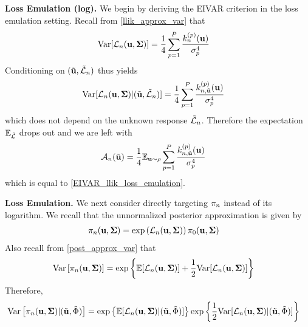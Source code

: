 \documentclass[12pt]{article}
\begin{document}
\bigskip
\noindent
\textbf{Loss Emulation (log).} 
We begin by deriving the EIVAR criterion in the loss emulation setting. Recall from \ref{llik_approx_var} that 
\begin{align*}
\mathrm{Var}[\mathcal{L}_{n}(\mathbf{u}, \boldsymbol{\Sigma})] &= \frac{1}{4} \sum_{p = 1}^{P} \frac{k_{n}^{(p)}(\mathbf{u})}{\sigma_{p}^4}
\end{align*}
Conditioning on $(\tilde{\mathbf{u}}, \tilde{\mathcal{L}}_{n})$ thus yields 
\begin{align*}
\mathrm{Var}[\mathcal{L}_{n}(\mathbf{u}, \boldsymbol{\Sigma}) | (\tilde{\mathbf{u}}, \tilde{\mathcal{L}}_{n})] &= \frac{1}{4} \sum_{p = 1}^{P} \frac{k_{n, \tilde{\mathbf{u}}}^{(p)}(\mathbf{u})}{\sigma_{p}^4}
\end{align*}
which does not depend on the unknown response $\tilde{\mathcal{L}}_{n}$. Therefore the expectation $\mathbb{E}_{\tilde{\mathcal{L}}}$ drops out and we are left with 
\begin{align*}
\mathcal{A}_{n}(\tilde{\mathbf{u}}) &= \frac{1}{4} \mathbb{E}_{\mathbf{u} \sim \rho} \sum_{p = 1}^{P} \frac{k_{n, \tilde{\mathbf{u}}}^{(p)}(\mathbf{u})}{\sigma_{p}^4}
\end{align*}
which is equal to \ref{EIVAR_llik_loss_emulation}.

\bigskip
\noindent
\textbf{Loss Emulation.}
 We next consider directly targeting $\pi_{n}$ instead of its logarithm. We recall that the unnormalized posterior approximation is given 
 by 
 \begin{align*}
 \pi_{n}(\mathbf{u}, \boldsymbol{\Sigma}) &= \exp\left(\mathcal{L}_{n}(\mathbf{u}, \boldsymbol{\Sigma}) \right)\pi_0(\mathbf{u}, \boldsymbol{\Sigma})
 \end{align*}
 Also recall from \ref{post_approx_var} that 
 \begin{align*}
 \mathrm{Var}\left[\pi_{n}(\mathbf{u}, \boldsymbol{\Sigma})\right] &= \exp\left\{\mathbb{E}[\mathcal{L}_{n}(\mathbf{u}, \boldsymbol{\Sigma})] + \frac{1}{2}\mathrm{Var}[\mathcal{L}_{n}(\mathbf{u}, \boldsymbol{\Sigma})] \right\}
\end{align*}
Therefore, 
 \begin{align*}
 \mathrm{Var}\left[\pi_{n}(\mathbf{u}, \boldsymbol{\Sigma}) | (\tilde{\mathbf{u}}, \tilde{\Phi})\right] &= \exp\left\{\mathbb{E}[\mathcal{L}_{n}(\mathbf{u}, \boldsymbol{\Sigma}) | (\tilde{\mathbf{u}}, \tilde{\Phi})]\right\} \exp\left\{\frac{1}{2}\mathrm{Var}[\mathcal{L}_{n}(\mathbf{u}, \boldsymbol{\Sigma}) | (\tilde{\mathbf{u}}, \tilde{\Phi})] \right\}
\end{align*}
\end{document}
